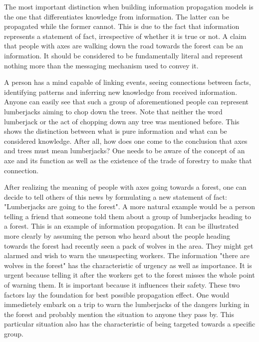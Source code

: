 
The most important distinction when building information propagation models is the one that differentiates knowledge from information.
The latter can be propagated while the former cannot.
This is due to the fact that information represents a statement of fact, irrespective of whether it is true or not.
A claim that people with axes are walking down the road towards the forest can be an information.
It should be considered to be fundamentally literal and represent nothing more than the messaging mechanism used to convey it.

A person has a mind capable of linking events, seeing connections between facts, identifying patterns and inferring new knowledge from received information.
Anyone can easily see that such a group of aforementioned people can represent lumberjacks aiming to chop down the trees.
Note that neither the word lumberjack or the act of chopping down any tree was mentioned before.
This shows the distinction between what is pure information and what can be considered knowledge.
After all, how does one come to the conclusion that axes and trees must mean lumberjacks?
One needs to be aware of the concept of an axe and its function as well as the existence of the trade of forestry to make that connection.

After realizing the meaning of people with axes going towards a forest, one can decide to tell others of this news by formulating a new statement of fact: "Lumberjacks are going to the forest".
A more natural example would be a person telling a friend that someone told them about a group of lumberjacks heading to a forest.
This is an example of information propagation.
It can be illustrated more clearly by assuming the person who heard about the people heading towards the forest had recently seen a pack of wolves in the area.
They might get alarmed and wish to warn the unsuspecting workers.
The information "there are wolves in the forest" has the characteristic of urgency as well as importance.
It is urgent because telling it after the workers get to the forest misses the whole point of warning them.
It is important because it influences their safety.
These two factors lay the foundation for best possible propagation effect.
One would immedietely embark on a trip to warn the lumberjacks of the dangers lurking in the forest and probably mention the situation to anyone they pass by.
This particular situation also has the characteristic of being targeted towards a specific group.

